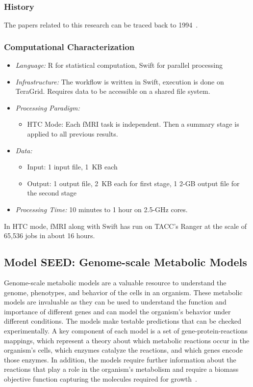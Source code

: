 \documentclass[10pt,letterpaper]{article}
\begin{document}
\subsubsection{History}
The papers related to this research can be traced back to 1994~\cite{fMRI-1994, fMRI-1995}.

\subsubsection{Computational Characterization}
\begin {itemize}
\item {\em Language:} R for statistical computation, Swift for parallel processing
\item {\em Infrastructure:} The workflow is written in Swift, execution is done on TeraGrid. Requires  data to be accessible on a shared file system.
\item {\em Processing Paradigm:}
  \begin{itemize}
  \item HTC Mode: Each fMRI task is independent. Then a summary stage is applied to all previous results.
  \end{itemize}

\item {\em Data:}
  \begin{itemize}
  \item Input: 1 input file, 1~KB each
  \item Output: 1 output file, 2~KB each for first stage, 1 2-GB output file for the second stage
  \end{itemize}

\item {\em Processing Time:} 10 minutes to 1 hour on 2.5-GHz cores.
\end{itemize}

 In HTC mode, fMRI along with Swift has run on TACC's Ranger at the scale of 65,536 jobs in about 16 hours.

\subsection{Model SEED: Genome-scale Metabolic Models}

Genome-scale metabolic models are a valuable resource to understand
the genome, phenotypes, and behavior of the cells in an organism.  These metabolic models
are invaluable as they can be used to understand the function and importance
of different genes and can model the organism's behavior under different
conditions.  The models make testable predictions that can
be checked experimentally.  A key
component of each model is a set of gene-protein-reactions mappings, which
represent a theory about which metabolic reactions occur in the
organism's cells, which enzymes catalyze the reactions, and which genes
encode those enzymes.  In addition, the models 
require further information about the reactions that play a role in the
organism's metabolism and require a biomass objective function capturing
the molecules required for growth~\cite{henry-09}.
\end{document}
